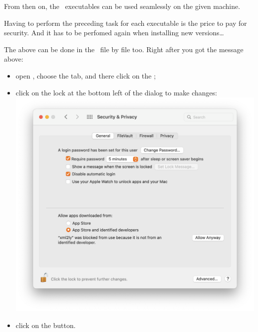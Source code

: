 From then on, the \mf\ executables can be used seamlessly on the given machine.

Having to perform the preceding task for each executable is the price to pay for security. And it has to be perfomed again when installing new versions\dots


The above can be done in the \GUI\ file by file too. Right after you got the message above:
\begin{itemize}
\item  open , choose the  tab, and there click on the ;

\item click on the lock at the bottom left of the dialog to make changes:\\
\includegraphics[scale=0.35]{../graphics/MacOSAllowAnyway.png}

\item click on the  button.

\end{itemize}

